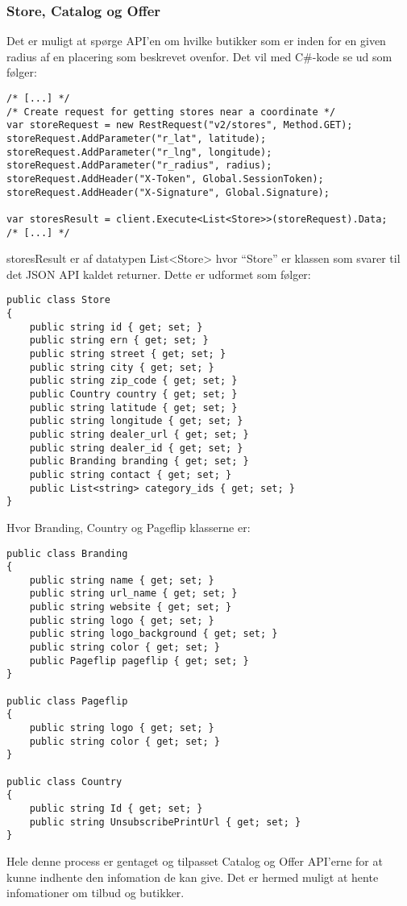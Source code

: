 \subsubsection{Store, Catalog og Offer}
Det er muligt at spørge API'en om hvilke butikker som er inden for en given radius af en placering som beskrevet ovenfor.
Det vil med C\#-kode se ud som følger:
\begin{lstlisting}[caption="C\#-kode som anvender ``/v2/stores'' delen af API'en til at hente butikker.",label=apistorecs]
/* [...] */
/* Create request for getting stores near a coordinate */
var storeRequest = new RestRequest("v2/stores", Method.GET);
storeRequest.AddParameter("r_lat", latitude);
storeRequest.AddParameter("r_lng", longitude);
storeRequest.AddParameter("r_radius", radius);
storeRequest.AddHeader("X-Token", Global.SessionToken);
storeRequest.AddHeader("X-Signature", Global.Signature);

var storesResult = client.Execute<List<Store>>(storeRequest).Data;
/* [...] */
\end{lstlisting}

storesResult er af datatypen List<Store> hvor ``Store'' er klassen som svarer til det JSON API kaldet returner.
Dette er udformet som følger:
\begin{lstlisting}[caption="Klassen Store",label=apistoreclass]
public class Store
{
    public string id { get; set; }
    public string ern { get; set; }
    public string street { get; set; }
    public string city { get; set; }
    public string zip_code { get; set; }
    public Country country { get; set; }
    public string latitude { get; set; }
    public string longitude { get; set; }
    public string dealer_url { get; set; }
    public string dealer_id { get; set; }
    public Branding branding { get; set; }
    public string contact { get; set; }
    public List<string> category_ids { get; set; }
}
\end{lstlisting}

Hvor Branding, Country og Pageflip klasserne er:

\begin{lstlisting}[caption="Klasserne Branding Pageflip og Country",label=apistoreclasshelpers]
public class Branding
{
    public string name { get; set; }
    public string url_name { get; set; }
    public string website { get; set; }
    public string logo { get; set; }
    public string logo_background { get; set; }
    public string color { get; set; }
    public Pageflip pageflip { get; set; }
}

public class Pageflip
{
    public string logo { get; set; }
    public string color { get; set; }
}

public class Country
{
    public string Id { get; set; }
    public string UnsubscribePrintUrl { get; set; }
}
\end{lstlisting}

Hele denne process er gentaget og tilpasset Catalog og Offer API'erne for at kunne indhente den infomation de kan give.
Det er hermed muligt at hente infomationer om tilbud og butikker. 
